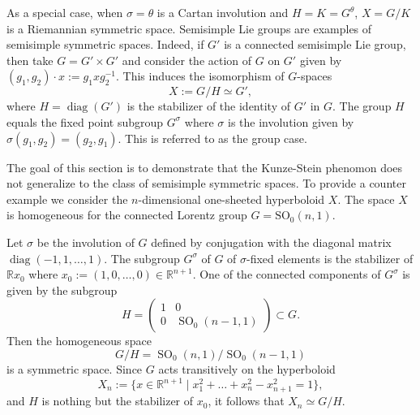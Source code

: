 \documentclass[12pt,letterpaper,titlepage,reqno]{amsart}
\theoremstyle{plain}
\theoremstyle{definition}
\numberwithin{equation}{section}
\newcommand{\R}{\mathbb{R}}
\newcommand{\SO}{\operatorname{SO}}
\newcommand{\diag}{\operatorname{diag}}
\begin{document}
As a special case, when $\sigma=\theta$ is a Cartan involution and $H=K=G^{\theta}$, $X=G/K$ is a Riemannian symmetric space. Semisimple Lie groups are examples of semisimple symmetric spaces. Indeed, if $G'
$ is a connected semisimple Lie group, then take $G=G'\times G'$ and consider the action of $G$ on $G'$ given by $(g_1,g_2)\cdot x:=g_1xg_2^{-1}$. This induces the isomorphism of $G$-spaces
$$
X
:=G/H\simeq G',
$$
where $H=\diag(G')$ is the stabilizer of the identity of $G'$ in $G$. The group $H$ equals the fixed point subgroup $G^{\sigma}$ where  $\sigma$ is the involution given by $\sigma(g_1,g_2)=(g_2, g_1)$. This is referred to as the group case.

The goal of this section is to demonstrate that the Kunze-Stein phenomon does not generalize to the class of semisimple symmetric spaces. To provide a counter example we consider the $n$-dimensional one-sheeted hyperboloid $X$. The space $X$ is homogeneous for the connected Lorentz group $G=\mathrm{SO}_0(n, 1)$.

Let  $\sigma$ be the involution of $G$ defined by
conjugation with  the diagonal matrix $\diag(-1,1,\dots,1)$. The subgroup $G^\sigma$ of
$G$ of $\sigma$-fixed elements is the stabilizer of $\R x_0$ where $x_0:=(1,0,\dots,0)\in \R^{n+1}$.
One of the connected components of $G^{\sigma}$ is given by the subgroup
$$
H=\begin{pmatrix} 1&0\\0&\SO_0(n\!-\!1,1)\end{pmatrix}\subset G.
$$
Then the homogeneous space
$$
G/H
=\SO_0(n,1)/\SO_0(n-1,1)
$$
is a symmetric space. Since $G$ acts transitively on the hyperboloid
$$
X_{n}
:=\{x\in\R^{n+1}\mid x_1^2+\dots +x_n^2-x_{n+1}^2=1\},
$$
and $H$ is nothing but the stabilizer of $x_0$, it follows that $X_{n}\simeq G/H$.
\end{document}
